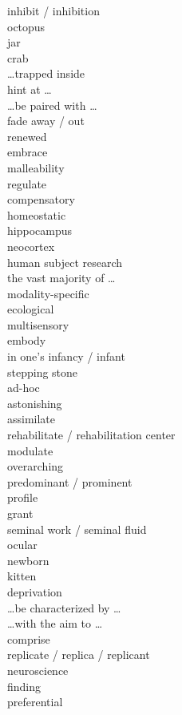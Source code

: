 \documentclass[12pt]{article}
\begin{document}
inhibit / inhibition \\
octopus \\
jar \\
crab \\
\dots trapped inside \\
hint at \dots \\
\dots be paired with \dots \\
fade away / out \\
renewed \\
embrace \\
malleability \\
regulate \\
compensatory \\
homeostatic \\
hippocampus \\
neocortex \\
human subject research \\
the vast majority of \dots \\
modality-specific \\
ecological \\
multisensory \\
embody \\
in one's infancy / infant \\
stepping stone \\
ad-hoc \\
astonishing \\
assimilate \\
rehabilitate / rehabilitation center \\
modulate \\
overarching \\
predominant / prominent \\
profile \\
grant \\
seminal work / seminal fluid \\
ocular \\
newborn \\
kitten \\
deprivation \\
\dots be characterized by \dots \\
\dots with the aim to \dots \\
comprise \\
replicate / replica / replicant \\
neuroscience \\
finding \\
preferential \\
\end{document}
